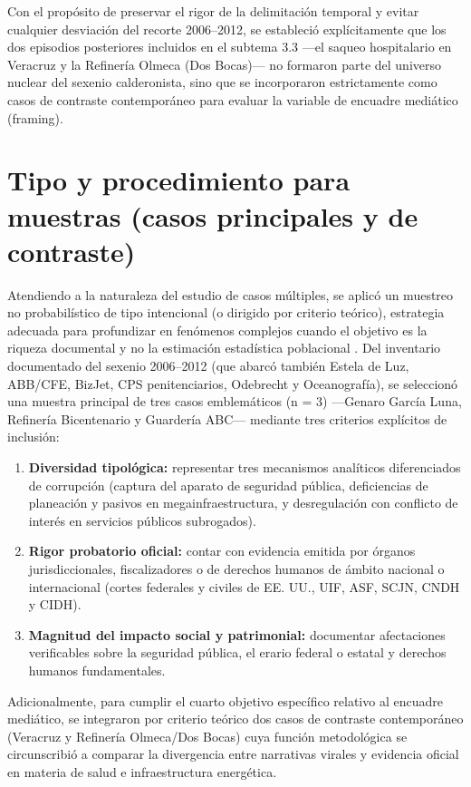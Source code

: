 Con el propósito de preservar el rigor de la delimitación temporal y evitar cualquier desviación del recorte 2006--2012, se estableció explícitamente que los dos episodios posteriores incluidos en el subtema 3.3 ---el saqueo hospitalario en Veracruz y la Refinería Olmeca (Dos Bocas)--- no formaron parte del universo nuclear del sexenio calderonista, sino que se incorporaron estrictamente como casos de contraste contemporáneo para evaluar la variable de encuadre mediático (framing).

\section{Tipo y procedimiento para muestras (casos principales y de contraste)}

Atendiendo a la naturaleza del estudio de casos múltiples, se aplicó un muestreo no probabilístico de tipo intencional (o dirigido por criterio teórico), estrategia adecuada para profundizar en fenómenos complejos cuando el objetivo es la riqueza documental y no la estimación estadística poblacional \citep{hernandez2014}. Del inventario documentado del sexenio 2006--2012 (que abarcó también Estela de Luz, ABB/CFE, BizJet, CPS penitenciarios, Odebrecht y Oceanografía), se seleccionó una muestra principal de tres casos emblemáticos (n = 3) ---Genaro García Luna, Refinería Bicentenario y Guardería ABC--- mediante tres criterios explícitos de inclusión:

\begin{enumerate}
  \item \textbf{Diversidad tipológica:} representar tres mecanismos analíticos diferenciados de corrupción (captura del aparato de seguridad pública, deficiencias de planeación y pasivos en megainfraestructura, y desregulación con conflicto de interés en servicios públicos subrogados).
  
  \item \textbf{Rigor probatorio oficial:} contar con evidencia emitida por órganos jurisdiccionales, fiscalizadores o de derechos humanos de ámbito nacional o internacional (cortes federales y civiles de EE. UU., UIF, ASF, SCJN, CNDH y CIDH).
  
  \item \textbf{Magnitud del impacto social y patrimonial:} documentar afectaciones verificables sobre la seguridad pública, el erario federal o estatal y derechos humanos fundamentales.
\end{enumerate}

Adicionalmente, para cumplir el cuarto objetivo específico relativo al encuadre mediático, se integraron por criterio teórico dos casos de contraste contemporáneo (Veracruz y Refinería Olmeca/Dos Bocas) cuya función metodológica se circunscribió a comparar la divergencia entre narrativas virales y evidencia oficial en materia de salud e infraestructura energética.

